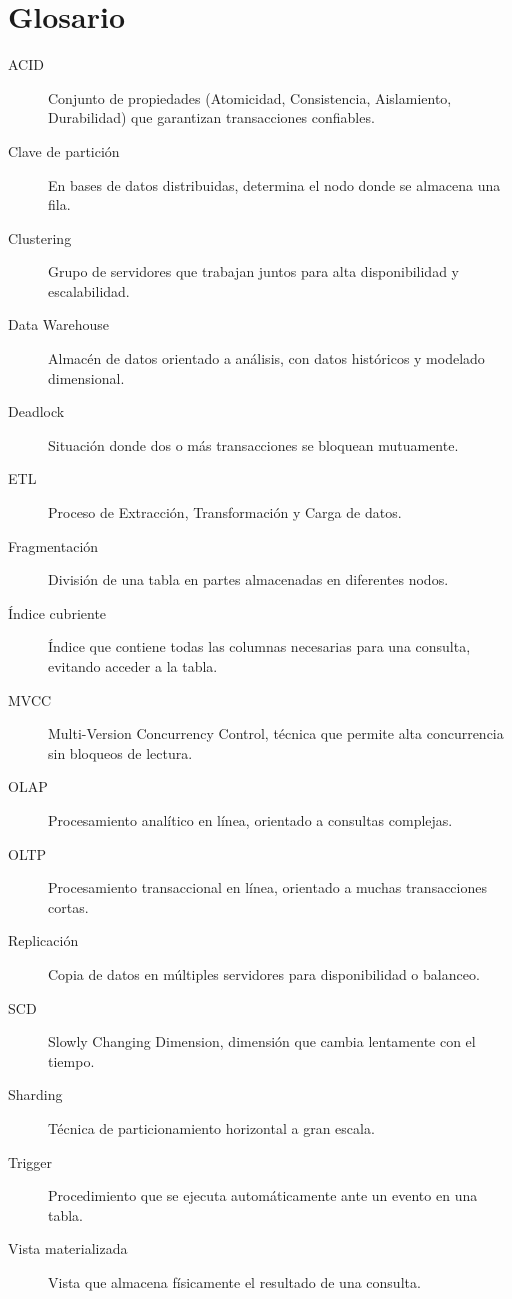 \documentclass[12pt,a4paper,openany,oneside]{book}
\begin{document}
\chapter*{Glosario}
\begin{description}
    \item[ACID] Conjunto de propiedades (Atomicidad, Consistencia, Aislamiento, Durabilidad) que garantizan transacciones confiables.
    \item[Clave de partición] En bases de datos distribuidas, determina el nodo donde se almacena una fila.
    \item[Clustering] Grupo de servidores que trabajan juntos para alta disponibilidad y escalabilidad.
    \item[Data Warehouse] Almacén de datos orientado a análisis, con datos históricos y modelado dimensional.
    \item[Deadlock] Situación donde dos o más transacciones se bloquean mutuamente.
    \item[ETL] Proceso de Extracción, Transformación y Carga de datos.
    \item[Fragmentación] División de una tabla en partes almacenadas en diferentes nodos.
    \item[Índice cubriente] Índice que contiene todas las columnas necesarias para una consulta, evitando acceder a la tabla.
    \item[MVCC] Multi-Version Concurrency Control, técnica que permite alta concurrencia sin bloqueos de lectura.
    \item[OLAP] Procesamiento analítico en línea, orientado a consultas complejas.
    \item[OLTP] Procesamiento transaccional en línea, orientado a muchas transacciones cortas.
    \item[Replicación] Copia de datos en múltiples servidores para disponibilidad o balanceo.
    \item[SCD] Slowly Changing Dimension, dimensión que cambia lentamente con el tiempo.
    \item[Sharding] Técnica de particionamiento horizontal a gran escala.
    \item[Trigger] Procedimiento que se ejecuta automáticamente ante un evento en una tabla.
    \item[Vista materializada] Vista que almacena físicamente el resultado de una consulta.
\end{description}
\end{document}
